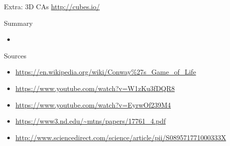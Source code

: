 \documentclass[bigger]{beamer}
\begin{document}
\begin{frame}[label=sec-24]{Extra: 3D CAs}
\url{http://cubes.io/}
\end{frame}
\begin{frame}[label=sec-25]{Summary}
\begin{itemize}
\item<1->
\end{itemize}
\end{frame}

\begin{frame}[label=sec-26]{Sources}
\begin{itemize}
\item \url{https://en.wikipedia.org/wiki/Conway\%27s_Game_of_Life}
\item \url{https://www.youtube.com/watch?v=W1zKu3fDQR8}
\item \url{https://www.youtube.com/watch?v=EyrwOf239M4}
\item \url{https://www3.nd.edu/~mtns/papers/17761_4.pdf}
\item \url{http://www.sciencedirect.com/science/article/pii/S089571771000333X}
\end{itemize}
\end{frame}
\end{document}
